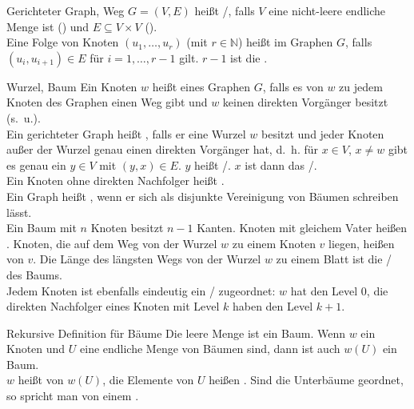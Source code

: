 \begin{Def}{Gerichteter Graph, Weg}
    $G = (V, E)$ heißt /, falls
    $V$ eine nicht-leere endliche Menge ist () und
    $E \subseteq V \times V$ (). \\
    Eine Folge von Knoten $(u_1, \ldots, u_r)$ (mit $r \in \mathbb{N}$) heißt
     im Graphen $G$, falls $(u_i, u_{i+1}) \in E$
    für $i = 1, \ldots, r - 1$ gilt.
    $r - 1$ ist die .
\end{Def}

\begin{Def}{Wurzel, Baum}
    Ein Knoten $w$ heißt  eines Graphen $G$, falls es von $w$
    zu jedem Knoten des Graphen einen Weg gibt und $w$ keinen direkten
    Vorgänger besitzt (s.~u.). \\
    Ein gerichteter Graph heißt , falls er eine Wurzel $w$
    besitzt und jeder Knoten außer der Wurzel genau einen direkten Vorgänger
    hat, d.~h. für $x \in V$, $x \not= w$ gibt es genau ein $y \in V$ mit
    $(y, x) \in E$.
    $y$ heißt /.
    $x$ ist dann das /. \\
    Ein Knoten ohne direkten Nachfolger heißt . \\
    Ein Graph heißt , wenn er sich als disjunkte Vereinigung
    von Bäumen schreiben lässt. \\
    Ein Baum mit $n$ Knoten besitzt $n - 1$ Kanten.
    Knoten mit gleichem Vater heißen .
    Knoten, die auf dem Weg von der Wurzel $w$ zu einem Knoten $v$
    liegen, heißen  von $v$.
    Die Länge des längsten Wegs von der Wurzel $w$ zu einem Blatt ist die
    / des Baums. \\
    Jedem Knoten ist ebenfalls eindeutig ein /
    zugeordnet: $w$ hat den Level $0$, die direkten Nachfolger eines Knoten
    mit Level $k$ haben den Level $k + 1$.
\end{Def}

\begin{Def}{Rekursive Definition für Bäume}
    Die leere Menge ist ein Baum. Wenn $w$ ein Knoten und $U$ eine endliche
    Menge von Bäumen sind, dann ist auch $w(U)$ ein Baum. \\
    $w$ heißt  von $w(U)$, die Elemente von $U$ heißen
    . Sind die Unterbäume geordnet, so spricht man von
    einem .
\end{Def}

